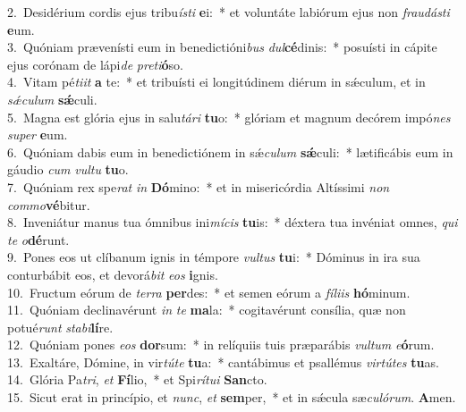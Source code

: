 {2.~}Desidérium cordis ejus tribu\textit{í}\textit{sti} \textbf{e}i:~* et voluntáte labiórum ejus non \textit{frau}\textit{dá}\textit{sti} \textbf{e}um.\\
{3.~}Quóniam prævenísti eum in benedictióni\textit{bus} \textit{dul}\textbf{cé}dinis:~* posuísti in cápite ejus corónam de lápi\textit{de} \textit{pre}\textit{ti}\textbf{ó}so.\\
{4.~}Vitam pé\textit{ti}\textit{it} \textbf{a} te:~* et tribuísti ei longitúdinem diérum in sǽculum, et in \textit{sǽ}\textit{cu}\textit{lum} \textbf{sǽ}culi.\\
{5.~}Magna est glória ejus in salu\textit{tá}\textit{ri} \textbf{tu}o:~* glóriam et magnum decórem impó\textit{nes} \textit{su}\textit{per} \textbf{e}um.\\
{6.~}Quóniam dabis eum in benedictiónem in sǽ\textit{cu}\textit{lum} \textbf{sǽ}culi:~* lætificábis eum in gáudio \textit{cum} \textit{vul}\textit{tu} \textbf{tu}o.\\
{7.~}Quóniam rex spe\textit{rat} \textit{in} \textbf{Dó}mino:~* et in misericórdia Altíssimi \textit{non} \textit{com}\textit{mo}\textbf{vé}bitur.\\
{8.~}Inveniátur manus tua ómnibus ini\textit{mí}\textit{cis} \textbf{tu}is:~* déxtera tua invéniat omnes, \textit{qui} \textit{te} \textit{o}\textbf{dé}runt.\\
{9.~}Pones eos ut clíbanum ignis in témpore \textit{vul}\textit{tus} \textbf{tu}i:~* Dóminus in ira sua conturbábit eos, et devorá\textit{bit} \textit{e}\textit{os} \textbf{i}gnis.\\
{10.~}Fructum eórum de \textit{ter}\textit{ra} \textbf{per}des:~* et semen eórum a \textit{fí}\textit{li}\textit{is} \textbf{hó}minum.\\
{11.~}Quóniam declinavérunt \textit{in} \textit{te} \textbf{ma}la:~* cogitavérunt consília, quæ non potué\textit{runt} \textit{sta}\textit{bi}\textbf{lí}re.\\
{12.~}Quóniam pones \textit{e}\textit{os} \textbf{dor}sum:~* in relíquiis tuis præparábis \textit{vul}\textit{tum} \textit{e}\textbf{ó}rum.\\
{13.~}Exaltáre, Dómine, in vir\textit{tú}\textit{te} \textbf{tu}a:~* cantábimus et psallémus \textit{vir}\textit{tú}\textit{tes} \textbf{tu}as.\\
{14.~}Glória Pa\textit{tri}, \textit{et} \textbf{Fí}lio,~* et Spi\textit{rí}\textit{tu}\textit{i} \textbf{San}cto.\\
{15.~}Sicut erat in princípio, et \textit{nunc}, \textit{et} \textbf{sem}per,~* et in sǽcula sæ\textit{cu}\textit{ló}\textit{rum}. \textbf{A}men.\\
